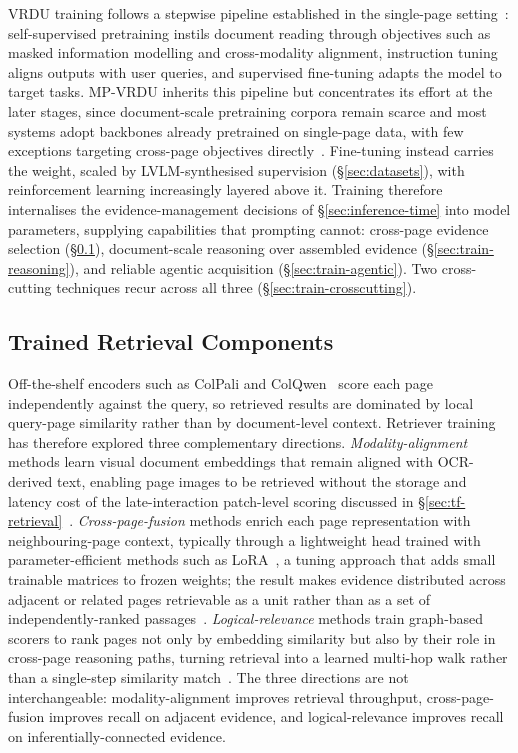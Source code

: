 VRDU training follows a stepwise pipeline established in the single-page setting~\cite{ding2026survey}: self-supervised pretraining instils document reading through objectives such as masked information modelling and cross-modality alignment, instruction tuning aligns outputs with user queries, and supervised fine-tuning adapts the model to target tasks. MP-VRDU inherits this pipeline but concentrates its effort at the later stages, since document-scale pretraining corpora remain scarce and most systems adopt backbones already pretrained on single-page data, with few exceptions targeting cross-page objectives directly~\cite{hu2025mplug, duan2025docopilot}. Fine-tuning instead carries the weight, scaled by LVLM-synthesised supervision (\S\ref{sec:datasets}), with reinforcement learning increasingly layered above it. Training therefore internalises the evidence-management decisions of \S\ref{sec:inference-time} into model parameters, supplying capabilities that prompting cannot: cross-page evidence selection (\S\ref{sec:train-retrieval}), document-scale reasoning over assembled evidence (\S\ref{sec:train-reasoning}), and reliable agentic acquisition (\S\ref{sec:train-agentic}). Two cross-cutting techniques recur across all three (\S\ref{sec:train-crosscutting}).

\subsection{Trained Retrieval Components}
\label{sec:train-retrieval}

Off-the-shelf encoders such as ColPali and ColQwen~\cite{faysse2025colpali} score each page independently against the query, so retrieved results are dominated by local query-page similarity rather than by document-level context. Retriever training has therefore explored three complementary directions. \textit{Modality-alignment} methods learn visual document embeddings that remain aligned with OCR-derived text, enabling page images to be retrieved without the storage and latency cost of the late-interaction patch-level scoring discussed in \S\ref{sec:tf-retrieval}~\cite{tanaka2025vdocrag}. \textit{Cross-page-fusion} methods enrich each page representation with neighbouring-page context, typically through a lightweight head trained with parameter-efficient methods such as LoRA~\cite{hu2022lora}, a tuning approach that adds small trainable matrices to frozen weights; the result makes evidence distributed across adjacent or related pages retrievable as a unit rather than as a set of independently-ranked passages~\cite{qian2026accurate}. \textit{Logical-relevance} methods train graph-based scorers to rank pages not only by embedding similarity but also by their role in cross-page reasoning paths, turning retrieval into a learned multi-hop walk rather than a single-step similarity match~\cite{wu2025molorag}. The three directions are not interchangeable: modality-alignment improves retrieval throughput, cross-page-fusion improves recall on adjacent evidence, and logical-relevance improves recall on inferentially-connected evidence.

